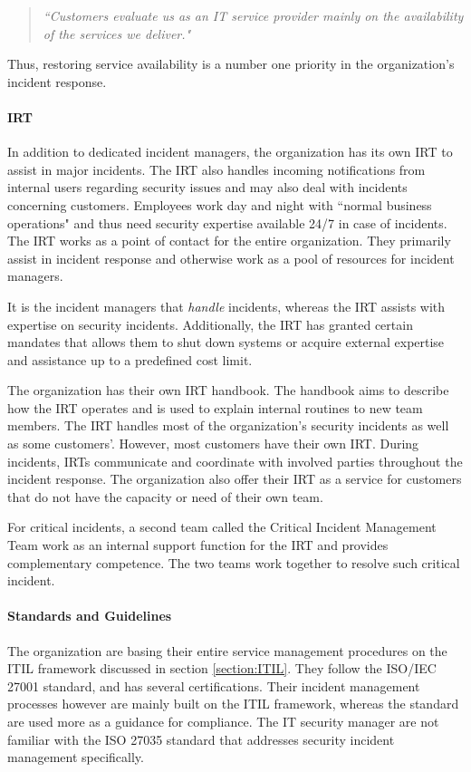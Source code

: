 \begin{quote}
\textit{``Customers evaluate us as an IT service provider mainly on the availability of the services we deliver."}
\end{quote}
Thus, restoring service availability is a number one priority in the organization's incident response.

\paragraph{\acl{IRT}}
In addition to dedicated incident managers, the organization has its own \ac{IRT} to assist in major incidents. The \ac{IRT} also handles incoming notifications from internal users regarding security issues and may also deal with incidents concerning customers. Employees work day and night with ``normal business operations" and thus need security expertise available 24/7 in case of incidents. The \ac{IRT} works as a point of contact for the entire organization. They primarily assist in incident response and otherwise work as a pool of resources for incident managers. 

It is the incident managers that \emph{handle} incidents, whereas the \ac{IRT} assists with expertise on security incidents. Additionally, the \ac{IRT} has granted certain mandates that allows them to shut down systems or acquire external expertise and assistance up to a predefined cost limit.    

The organization has their own \ac{IRT} handbook. The handbook aims to describe how the \ac{IRT} operates and is used to explain internal routines to new team members. The \ac{IRT} handles most of the organization's security incidents as well as some customers'. However, most customers have their own \ac{IRT}. During incidents, \acp{IRT} communicate and coordinate with involved parties throughout the incident response. The organization also offer their \ac{IRT} as a service for customers that do not have the capacity or need of their own team.

For critical incidents, a second team called the Critical Incident Management Team work as an internal support function for the \ac{IRT} and provides complementary competence. The two teams work together to resolve such critical incident. 

\paragraph{Standards and Guidelines}
The organization are basing their entire service management procedures on the ITIL framework discussed in section \ref{section:ITIL}. They follow the ISO/IEC 27001 standard, and has several certifications. Their incident management processes however are mainly built on the ITIL framework, whereas the standard are used more as a guidance for compliance. The IT security manager are not familiar with the ISO 27035 standard that addresses security incident management specifically. 

